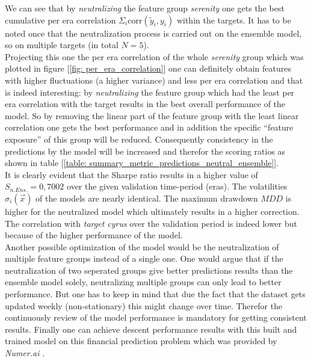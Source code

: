 \documentclass[12pt, a4paper]{article}
\begin{document}
We can see that by \textit{neutralizing} the feature group \textit{serenity} one gets the best cumulative per era correlation $\Sigma_i \text{corr}(\tilde{y}_i,y_i)$ within the targets. It has to be noted once that the neutralization process is carried out on the ensemble model, so on multiple targets (in total $N = 5$). \\
Projecting this one the per era correlation of the whole \textit{serenity} group which was plotted in figure [\ref{fig: per_era_correlation}] one can definitely obtain features with higher fluctuations (a higher variance) and less per era correlation and that is indeed interesting: by \textit{neutralizing} the feature group which had the least per era correlation with the target results in the best overall performance of the model. So by removing the linear part of the feature group with the least linear correlation one gets the best performance and in addition the specific ``feature exposure'' of this group will be reduced. Consequently consistency in the predictions by the model will be increased and therefor the scoring ratios as shown in table [\ref{table: summary_metric_predictions_neutral_ensemble}]. \\
It is clearly evident that the Sharpe ratio results in a higher value of $S_{n.Ens.} = 0{,}7002$ over the given validation time-period (eras). The volatilities $\sigma_{i}(\vec{x})$ of the models are nearly identical. The maximum drawdown $MDD$ is higher for the neutralized model which ultimately results in a higher correction. \\
The correlation with \textit{target cyrus} over the validation period is indeed lower but because of the higher performance of the model. \\
Another possible optimization of the model would be the neutralization of multiple feature groups instead of a single one. One would argue that if the neutralization of two seperated groups give better predictions results than the ensemble model solely, neutralizing multiple groups can only lead to better performance. But one has to keep in mind that due the fact that the dataset gets updated weekly (non-stationary) this might change over time. Therefor the continuously review of the model performance is mandatory for getting consistent results.
Finally one can achieve descent performance results with this built and trained model on this financial prediction problem which was provided by \textit{Numer.ai} \cite{Numerai}.
\end{document}
